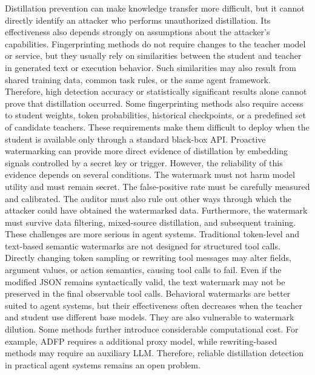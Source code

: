 Distillation prevention can make knowledge transfer more difficult, but it
cannot directly identify an attacker who performs unauthorized distillation.
Its effectiveness also depends strongly on assumptions about the attacker's
capabilities. Fingerprinting methods do not require changes to
the teacher model or service, but they usually rely on similarities between
the student and teacher in generated text or execution behavior. Such
similarities may also result from shared training data, common task rules, or
the same agent framework. Therefore, high detection accuracy or statistically
significant results alone cannot prove that distillation occurred. Some
fingerprinting methods also require access to student weights, token
probabilities, historical checkpoints, or a predefined set of candidate
teachers. These requirements make them difficult to deploy when the student is
available only through a standard black-box API. Proactive watermarking can provide more direct evidence of distillation by
embedding signals controlled by a secret key or trigger. However, the
reliability of this evidence depends on several conditions. The watermark must
not harm model utility and must remain secret. The false-positive rate must be
carefully measured and calibrated. The auditor must also rule out other ways
through which the attacker could have obtained the watermarked data.
Furthermore, the watermark must survive data filtering, mixed-source
distillation, and subsequent training. These challenges are more serious in
agent systems. Traditional token-level and text-based semantic watermarks are
not designed for structured tool calls. Directly changing token sampling or
rewriting tool messages may alter fields, argument values, or action semantics,
causing tool calls to fail. Even if the modified JSON remains syntactically
valid, the text watermark may not be preserved in the final observable tool
calls. Behavioral watermarks are better suited to agent systems, but their
effectiveness often decreases when the teacher and student use different base
models. They are also vulnerable to watermark dilution. Some methods further
introduce considerable computational cost. For example, ADFP requires a additional proxy model, while rewriting-based methods may require
an auxiliary LLM. Therefore, reliable distillation detection in practical
agent systems remains an open problem.


